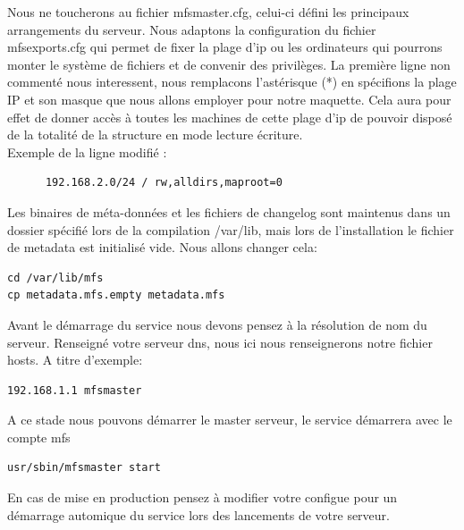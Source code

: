 \documentclass[12pt]{report}
\begin{document}
Nous ne toucherons au fichier mfsmaster.cfg, celui-ci défini les principaux arrangements du serveur.
Nous adaptons la configuration du fichier mfsexports.cfg qui permet de fixer la plage d'ip ou les ordinateurs qui pourrons monter le système de fichiers et de convenir des privilèges.
La première ligne non commenté nous interessent, nous remplacons l'astérisque (*) en spécifions la plage IP et son masque que nous allons employer pour notre maquette.
Cela aura pour effet de donner accès à toutes les machines de cette plage d'ip de pouvoir disposé de la totalité de la structure en mode lecture écriture.\\
Exemple de la ligne modifié :
\begin{lstlisting}
	  192.168.2.0/24 / rw,alldirs,maproot=0
	  \end{lstlisting}
Les binaires de méta-données et les fichiers de changelog sont maintenus dans un dossier spécifié lors de la compilation /var/lib, mais lors de l'installation le fichier de metadata est initialisé vide.
Nous allons changer cela: 
\begin{lstlisting}
cd /var/lib/mfs
cp metadata.mfs.empty metadata.mfs
	  \end{lstlisting}
Avant le démarrage du service nous devons pensez à la résolution de nom du serveur. Renseigné votre serveur dns, nous ici nous renseignerons notre fichier hosts.
A titre d'exemple:
  \begin{lstlisting}
192.168.1.1 mfsmaster
	  \end{lstlisting}
A ce stade nous pouvons démarrer le master serveur, le service démarrera avec le compte mfs
  \begin{lstlisting}
usr/sbin/mfsmaster start
	  \end{lstlisting}
En cas de mise en production pensez à modifier votre configue pour un démarrage automique du service lors des lancements de votre serveur.
\end{document}
